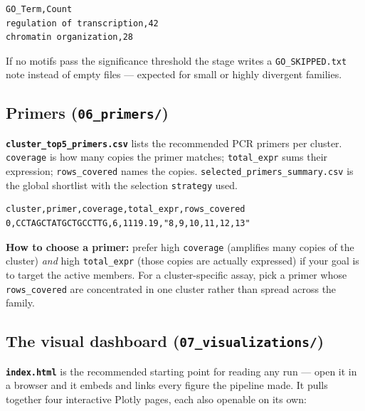 \documentclass[11pt]{article}
\begin{document}
\begin{lstlisting}
GO_Term,Count
regulation of transcription,42
chromatin organization,28
\end{lstlisting}

\noindent If no motifs pass the significance threshold the stage writes a
\texttt{GO\_SKIPPED.txt} note instead of empty files --- expected for
small or highly divergent families.

\subsection{Primers (\texttt{06\_primers/})}

\textbf{\texttt{cluster\_top5\_primers.csv}} lists the recommended PCR
primers per cluster. \texttt{coverage} is how many copies the primer
matches; \texttt{total\_expr} sums their expression; \texttt{rows\_covered}
names the copies. \texttt{selected\_primers\_summary.csv} is the global
shortlist with the selection \texttt{strategy} used.

\begin{lstlisting}
cluster,primer,coverage,total_expr,rows_covered
0,CCTAGCTATGCTGCCTTG,6,1119.19,"8,9,10,11,12,13"
\end{lstlisting}

\noindent\textbf{How to choose a primer:} prefer high \texttt{coverage}
(amplifies many copies of the cluster) \emph{and} high \texttt{total\_expr}
(those copies are actually expressed) if your goal is to target the active
members. For a cluster-specific assay, pick a primer whose
\texttt{rows\_covered} are concentrated in one cluster rather than spread
across the family.

\subsection{The visual dashboard (\texttt{07\_visualizations/})}

\textbf{\texttt{index.html}} is the recommended starting point for reading
any run --- open it in a browser and it embeds and links every figure the
pipeline made. It pulls together four interactive Plotly pages, each also
openable on its own:
\end{document}

